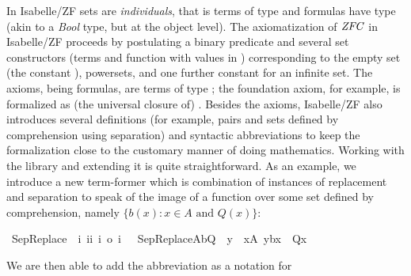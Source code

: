 In Isabelle/ZF sets are \emph{individuals}, that is terms of type
 and formulas have type  
(akin to a \emph{Bool} type, but at the object level). 
The  axiomatization 
of $\mathit{ZFC}$ in Isabelle/ZF proceeds by postulating  a binary predicate
\isatt{\ensuremath{\in}} and   several set
constructors (terms and function with values in ) corresponding to the  empty set
(the constant ), powersets, and one further constant
 for an infinite set. The axioms, being formulas, are terms
of type ; 
the foundation axiom, for example, is formalized as (the universal
closure of) 
. Besides the axioms, Isabelle/ZF also
introduces several definitions (for example, pairs and sets defined by
comprehension using separation) and syntactic abbreviations to keep
the formalization close to the customary manner of doing mathematics.
Working with the library and extending it is quite
straightforward. 
As an example, we introduce  a new term-former which is combination of
instances of replacement and separation to speak of the image of a function over some set
defined by comprehension, namely $\{b(x): x\in A\text{ and }Q(x)\}$:
\begin{isabelle}
  \isamarkupfalse%
  \ SepReplace\ {\isacharcolon}{\isacharcolon}\
  {\isachardoublequoteopen}{\isacharbrackleft}i{\isacharcomma}\
  i{\isasymRightarrow}i{\isacharcomma}\ i{\isasymRightarrow}\
  o{\isacharbrackright}\
  {\isasymRightarrow}i{\isachardoublequoteclose}\
  \isanewline \ \
  {\isachardoublequoteopen}SepReplace{\isacharparenleft}A{\isacharcomma}b{\isacharcomma}Q{\isacharparenright}\
  {\isacharequal}{\isacharequal}\ {\isacharbraceleft}y\ {\isachardot}\
  x{\isasymin}A{\isacharcomma}\
  y{\isacharequal}b{\isacharparenleft}x{\isacharparenright}\
  {\isasymand}\
  Q{\isacharparenleft}x{\isacharparenright}{\isacharbraceright}{\isachardoublequoteclose}
\end{isabelle}
\noindent %
We are then able to add the abbreviation  as a notation for
